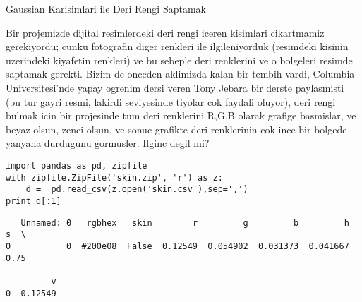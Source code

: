 \documentclass[12pt,fleqn]{article}\usepackage{../common}
\begin{document}
Gaussian Karisimlari ile Deri Rengi Saptamak

Bir projemizde dijital resimlerdeki deri rengi iceren kisimlari cikartmamiz
gerekiyordu; cunku fotografin diger renkleri ile ilgileniyorduk (resimdeki
kisinin uzerindeki kiyafetin renkleri) ve bu sebeple deri renklerini ve o
bolgeleri resimde saptamak gerekti. Bizim de onceden aklimizda kalan bir
tembih vardi, Columbia Universitesi'nde yapay ogrenim dersi veren Tony
Jebara bir derste paylasmisti (bu tur gayri resmi, lakirdi seviyesinde
tiyolar cok faydali oluyor), deri rengi bulmak icin bir projesinde tum deri
renklerini R,G,B olarak grafige basmislar, ve beyaz olsun, zenci olsun, ve
sonuc grafikte deri renklerinin cok ince bir bolgede yanyana durdugunu
gormusler. Ilginc degil mi? 


\begin{verbatim}
import pandas as pd, zipfile
with zipfile.ZipFile('skin.zip', 'r') as z:
    d =  pd.read_csv(z.open('skin.csv'),sep=',')
print d[:1]
\end{verbatim}

\begin{verbatim}
   Unnamed: 0   rgbhex   skin        r         g         b         h     s  \
0           0  #200e08  False  0.12549  0.054902  0.031373  0.041667  0.75   

         v  
0  0.12549  
\end{verbatim}
\end{document}
